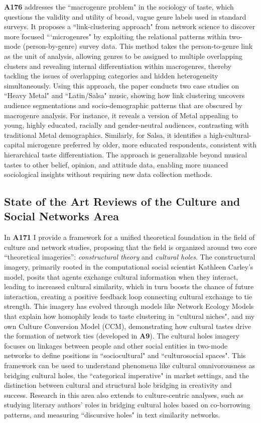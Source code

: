 \documentclass[a4paper,11pt]{extarticle}
\begin{document}
\textbf{A176} addresses the ``macrogenre problem" in the sociology of taste, which questions the validity and utility of broad, vague genre labels used in standard surveys. It proposes a ``link-clustering approach" from network science to discover more focused ```microgenres" by exploiting the relational patterns within two-mode (person-by-genre) survey data. This method takes the person-to-genre link as the unit of analysis, allowing genres to be assigned to multiple overlapping clusters and revealing internal differentiation within macrogenres, thereby tackling the issues of overlapping categories and hidden heterogeneity simultaneously. Using this approach, the paper conducts two case studies on ``Heavy Metal" and ``Latin/Salsa" music, showing how link clustering uncovers audience segmentations and socio-demographic patterns that are obscured by macrogenre analysis. For instance, it reveals a version of Metal appealing to young, highly educated, racially and gender-neutral audiences, contrasting with traditional Metal demographics. Similarly, for Salsa, it identifies a high-cultural-capital microgenre preferred by older, more educated respondents, consistent with hierarchical taste differentiation. The approach is generalizable beyond musical tastes to other belief, opinion, and attitude data, enabling more nuanced sociological insights without requiring new data collection methods.

\subsection*{State of the Art Reviews of the Culture and Social Networks Area}
In \textbf{A171} I provide a framework for a unified theoretical foundation in the field of culture and network studies, proposing that the field is organized around two core ``theoretical imageries'': \textit{constructural theory} and \textit{cultural holes}. The constructural imagery, primarily rooted in the computational social scientist Kathleen Carley's model, posits that agents exchange cultural information when they interact, leading to increased cultural similarity, which in turn boosts the chance of future interaction, creating a positive feedback loop connecting cultural exchange to tie strength. This imagery has evolved through models like Network Ecology Models that explain how homophily leads to taste clustering in ``cultural niches", and my own Culture Conversion Model (CCM), demonstrating how cultural tastes drive the formation of network ties (developed in \textbf{A9}). The cultural holes imagery focuses on linkages between people and other social entities in two-mode networks to define positions in ``sociocultural" and ``culturosocial spaces". This framework can be used to understand phenomena like cultural omnivorousness as bridging cultural holes, the ``categorical imperative" in market settings, and the distinction between cultural and structural hole bridging in creativity and success. Research in this area also extends to culture-centric analyses, such as studying literary authors' roles in bridging cultural holes based on co-borrowing patterns, and measuring ``discursive holes" in text similarity networks.
\end{document}
